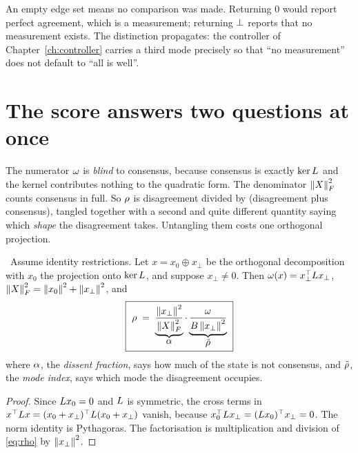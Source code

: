 \begin{remark}\label{rem:unk}
An empty edge set means no comparison was made. Returning $0$ would
report perfect agreement, which is a measurement; returning $\bot$
reports that no measurement exists. The distinction propagates: the
controller of Chapter~\ref{ch:controller} carries a third mode precisely
so that ``no measurement'' does not default to ``all is well''.
\end{remark}

\section{The score answers two questions at once}

\begin{intu}\Intu
The numerator $\omega$ is \emph{blind} to consensus, because consensus
is exactly $\ker L$ and the kernel contributes nothing to the
quadratic form. The denominator $\left\lVert X \right\rVert_F^2$ counts consensus in full.
So $\rho$ is disagreement divided by (disagreement plus consensus),
tangled together with a second and quite different quantity saying which
\emph{shape} the disagreement takes. Untangling them costs one
orthogonal projection.
\end{intu}

\begin{proposition}\label{prop:split}
\ProvedCond\ Assume identity restrictions. Let $x=x_0\oplus x_\perp$ be
the orthogonal decomposition with $x_0$ the projection onto $\ker L$,
and suppose $x_\perp\neq0$. Then
$\omega(x)=x_\perp^\top L x_\perp$,
$\left\lVert X \right\rVert_F^2=\left\lVert x_0 \right\rVert^2+\left\lVert x_\perp \right\rVert^2$, and
\begin{equation}\label{eq:split}
  \boxed{\
  \rhoscore\;=\;
  \underbrace{\frac{\norm{x_\perp}^2}{\norm{X}_F^2}}_{\textstyle\dissent}
  \cdot
  \underbrace{\frac{\discord}{\AM\norm{x_\perp}^2}}_{\textstyle\rhotil}\ }
\end{equation}
where $\alpha$, the \emph{dissent fraction}, says how much of the
state is not consensus, and $\tilde{\rho}$, the \emph{mode index}, says which
mode the disagreement occupies.
\end{proposition}
\begin{proof}
Since $L x_0=0$ and $L$ is symmetric, the cross terms in
$x^\top L x=(x_0+x_\perp)^\top L(x_0+x_\perp)$ vanish, because
$x_0^\top L x_\perp=(L x_0)^\top x_\perp=0$. The norm identity is
Pythagoras. The factorisation is multiplication and division of
\eqref{eq:rho} by $\left\lVert x_\perp \right\rVert^2$.
\end{proof}

